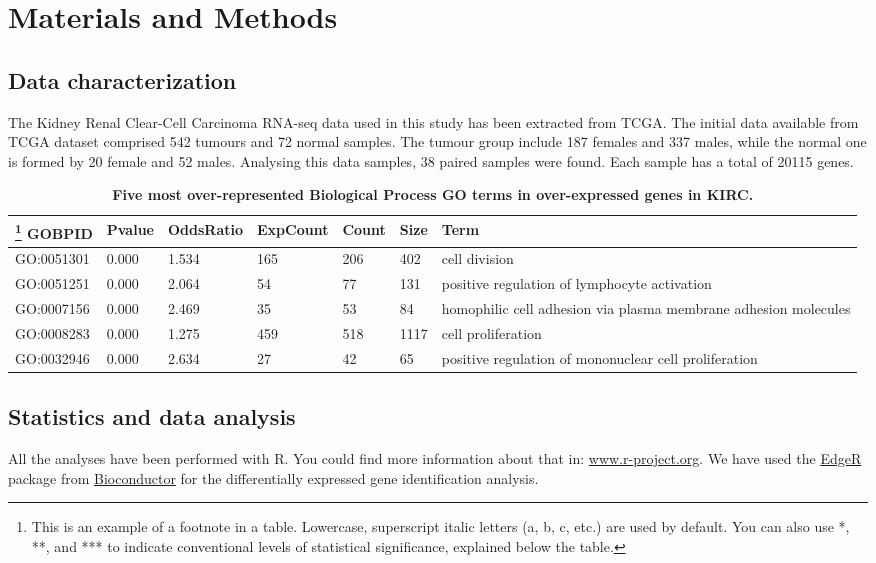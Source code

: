 \documentclass[9pt,twocolumn,twoside]{gsajnl}
\begin{document}
\section*{Materials and Methods}
\subsection*{Data characterization}
The Kidney Renal Clear-Cell Carcinoma RNA-seq data used in this study has been extracted from TCGA. The initial data available from TCGA dataset comprised 542 tumours and 72 normal samples. The tumour group include 187 females and 337 males, while the normal one is formed by 20 female and 52 males. Analysing this data samples, 38 paired samples were found. Each sample has a total of 20115 genes. 

\newcolumntype{b}{X}
\begin{table}[htbp]
\centering
\caption{\bf Five most over-represented Biological Process GO terms in over-expressed genes in KIRC. }
\begin{tableminipage}{\textwidth}
\begin{tabularx}{\textwidth}{ssssssb}
\hline
\footnote{This is an example of a footnote in a table. Lowercase, superscript italic letters (a, b, c, etc.) are used by default. You can also use *, **, and *** to indicate conventional levels of statistical significance, explained below the table.}
GOBPID & Pvalue & OddsRatio & ExpCount & Count & Size & Term\\
\hline
GO:0051301 & 0.000 & 1.534 & 165 & 206 & 402 & cell division\\
GO:0051251 & 0.000 & 2.064 & 54 & 77 & 131 & positive regulation of lymphocyte activation\\
GO:0007156 & 0.000 & 2.469 & 35 & 53 & 84 & homophilic cell adhesion via plasma membrane adhesion molecules\\
GO:0008283 & 0.000 & 1.275 & 459 & 518 & 1117 & cell proliferation\\
GO:0032946 & 0.000 & 2.634 & 27 & 42 & 65 & positive regulation of mononuclear cell proliferation\\
\hline
\end{tabularx}
\end{tableminipage}
\end{table}

\subsection*{Statistics and data analysis}
All the analyses have been performed with R. You could find more information about that in: \url{www.r-project.org}. We have used the \href{https://bioconductor.org/packages/release/bioc/html/edgeR.html}{EdgeR} \citep{Robinson2010} package from \href{https://bioconductor.org}{Bioconductor} \citep{Gentleman2004}  for the differentially expressed gene identification analysis.
\end{document}
